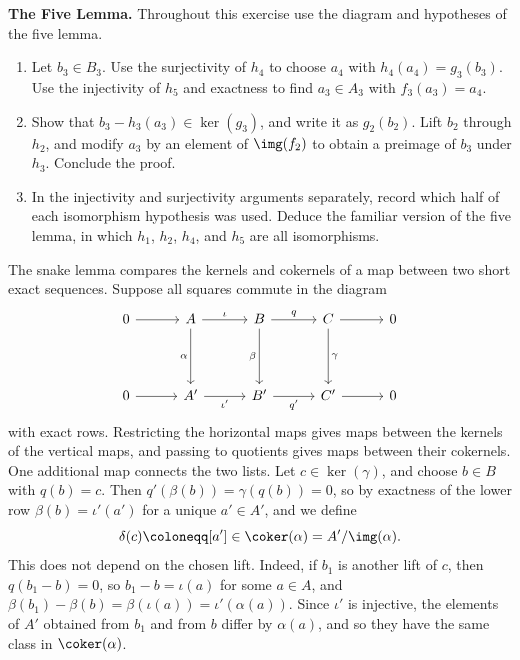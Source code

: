 \documentclass[12pt,reqno]{amsart}
\begin{document}
\hrulefill

\begin{problems}
\item\label{p:five} \textbf{The Five Lemma.} Throughout this exercise use the diagram and hypotheses of the five lemma.
\begin{enumerate}
\item Let $b_3\in B_3$. Use the surjectivity of $h_4$ to choose $a_4$ with $h_4(a_4)=g_3(b_3)$. Use the injectivity of $h_5$ and exactness to find $a_3\in A_3$ with $f_3(a_3)=a_4$.
\item Show that $b_3-h_3(a_3)\in\ker(g_3)$, and write it as $g_2(b_2)$. Lift $b_2$ through $h_2$, and modify $a_3$ by an element of $\img(f_2)$ to obtain a preimage of $b_3$ under $h_3$. Conclude the proof.
\item In the injectivity and surjectivity arguments separately, record which half of each isomorphism hypothesis was used. Deduce the familiar version of the five lemma, in which $h_1$, $h_2$, $h_4$, and $h_5$ are all isomorphisms.
\end{enumerate}
\end{problems}

\hrulefill

The snake lemma compares the kernels and cokernels of a map between two short exact sequences. Suppose all squares commute in the diagram
\[
\begin{tikzcd}[column sep=3em,row sep=4em]
0\arrow[r]&A\arrow[r,"\iota"]\arrow[d,"\alpha"']&B\arrow[r,"q"]\arrow[d,"\beta"']&C\arrow[r]\arrow[d,"\gamma"]&0\\
0\arrow[r]&A'\arrow[r,"\iota'"']&B'\arrow[r,"q'"']&C'\arrow[r]&0
\end{tikzcd}
\]
with exact rows. Restricting the horizontal maps gives maps between the kernels of the vertical maps, and passing to quotients gives maps between their cokernels. One additional map connects the two lists. Let $c\in\ker(\gamma)$, and choose $b\in B$ with $q(b)=c$. Then $q'(\beta(b))=\gamma(q(b))=0$, so by exactness of the lower row $\beta(b)=\iota'(a')$ for a unique $a'\in A'$, and we define
\[
\delta(c)\coloneqq[a']\in\coker(\alpha)=A'/\img(\alpha).
\]
This does not depend on the chosen lift. Indeed, if $b_1$ is another lift of $c$, then $q(b_1-b)=0$, so $b_1-b=\iota(a)$ for some $a\in A$, and $\beta(b_1)-\beta(b)=\beta(\iota(a))=\iota'(\alpha(a))$. Since $\iota'$ is injective, the elements of $A'$ obtained from $b_1$ and from $b$ differ by $\alpha(a)$, and so they have the same class in $\coker(\alpha)$.
\end{document}
